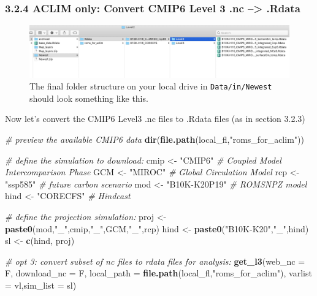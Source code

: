 \documentclass[
]{article}
\newenvironment{Shaded}{\begin{snugshade}}{\end{snugshade}}
\newcommand{\CommentTok}[1]{\textcolor[rgb]{0.56,0.35,0.01}{\textit{#1}}}
\newcommand{\DataTypeTok}[1]{\textcolor[rgb]{0.13,0.29,0.53}{#1}}
\newcommand{\KeywordTok}[1]{\textcolor[rgb]{0.13,0.29,0.53}{\textbf{#1}}}
\newcommand{\NormalTok}[1]{#1}
\newcommand{\StringTok}[1]{\textcolor[rgb]{0.31,0.60,0.02}{#1}}
\begin{document}
\hypertarget{aclim-only-convert-cmip6-level-3-.nc-.rdata}{%
\subsubsection{3.2.4 ACLIM only: Convert CMIP6 Level 3 .nc
--\textgreater{}
.Rdata}\label{aclim-only-convert-cmip6-level-3-.nc-.rdata}}

\begin{figure}
\centering
\includegraphics[width=1\textwidth,height=\textheight]{Figs/filestructure.jpg}
\caption{The final folder structure on your local drive in
\texttt{Data/in/Newest} should look something like this.}
\end{figure}

Now let's convert the CMIP6 Level3 .nc files to .Rdata files (as in
section 3.2.3)

\begin{Shaded}
\begin{Highlighting}[]
    \CommentTok{# preview the available CMIP6 data}
    \KeywordTok{dir}\NormalTok{(}\KeywordTok{file.path}\NormalTok{(local_fl,}\StringTok{"roms_for_aclim"}\NormalTok{))}

  \CommentTok{# define the simulation to download:}
\NormalTok{    cmip <-}\StringTok{ "CMIP6"}     \CommentTok{# Coupled Model Intercomparison Phase}
\NormalTok{    GCM  <-}\StringTok{ "MIROC"}     \CommentTok{# Global Circulation Model}
\NormalTok{    rcp  <-}\StringTok{ "ssp585"}     \CommentTok{# future carbon scenario}
\NormalTok{    mod  <-}\StringTok{ "B10K-K20P19"}  \CommentTok{# ROMSNPZ model}
\NormalTok{    hind <-}\StringTok{ "CORECFS"}      \CommentTok{# Hindcast}
    
    \CommentTok{# define the projection simulation:}
\NormalTok{    proj  <-}\StringTok{ }\KeywordTok{paste0}\NormalTok{(mod,}\StringTok{"_"}\NormalTok{,cmip,}\StringTok{"_"}\NormalTok{,GCM,}\StringTok{"_"}\NormalTok{,rcp)}
\NormalTok{    hind  <-}\StringTok{ }\KeywordTok{paste0}\NormalTok{(}\StringTok{"B10K-K20"}\NormalTok{,}\StringTok{"_"}\NormalTok{,hind)}
\NormalTok{    sl    <-}\StringTok{ }\KeywordTok{c}\NormalTok{(hind, proj)}
    
    \CommentTok{# opt 3:  convert subset of nc files to rdata files for analysis:}
    \KeywordTok{get_l3}\NormalTok{(}\DataTypeTok{web_nc =}\NormalTok{ F, }\DataTypeTok{download_nc =}\NormalTok{ F,}
          \DataTypeTok{local_path =} \KeywordTok{file.path}\NormalTok{(local_fl,}\StringTok{"roms_for_aclim"}\NormalTok{),}
          \DataTypeTok{varlist =}\NormalTok{ vl,}\DataTypeTok{sim_list =}\NormalTok{ sl)}
\end{Highlighting}
\end{Shaded}
\end{document}
